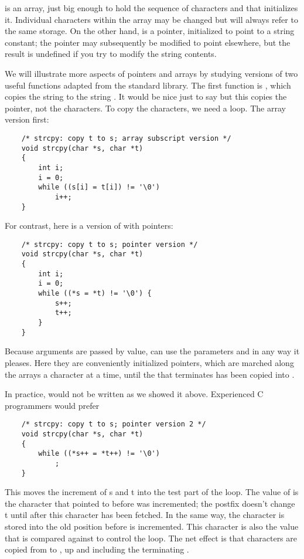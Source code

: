  is an array, just big enough to hold the sequence of characters and  that initializes it.
Individual characters within the array may be changed but  will always refer to the same storage.
On the other hand,  is a pointer, initialized to point to a string constant; the pointer may subsequently be modified to point elsewhere, but the result is undefined if you try to modify the string contents.

We will illustrate more aspects of pointers and arrays by studying versions of two useful functions adapted from the standard library.
The first function is , which copies the string  to the string . It would be nice just to say  but this copies the pointer, not the characters.
To copy the characters, we need a loop. The array version first:

\begin{lstlisting}
    /* strcpy: copy t to s; array subscript version */
    void strcpy(char *s, char *t)
    {
        int i;
        i = 0;
        while ((s[i] = t[i]) != '\0')
            i++;
    }
\end{lstlisting}

For contrast, here is a version of  with pointers:

\begin{lstlisting}
    /* strcpy: copy t to s; pointer version */
    void strcpy(char *s, char *t)
    {
        int i;
        i = 0;
        while ((*s = *t) != '\0') {
            s++;
            t++;
        }
    }
\end{lstlisting}

Because arguments are passed by value,  can use the parameters  and  in any way it pleases.
Here they are conveniently initialized pointers, which are marched along the arrays a character at a time, until the  that terminates  has been copied into .


In practice,  would not be written as we showed it above. Experienced C programmers would prefer

\begin{lstlisting}
    /* strcpy: copy t to s; pointer version 2 */
    void strcpy(char *s, char *t)
    {
        while ((*s++ = *t++) != '\0')
            ;
    }
\end{lstlisting}

This moves the increment of s and t into the test part of the loop.
The value of  is the character that  pointed to before  was incremented; the postfix \code{++} doesn't change t until after this character has been fetched.
In the same way, the character is stored into the old  position before  is incremented. This character is also the value that is compared against  to control the loop.
The net effect is that characters are copied from  to , up and including the terminating .

